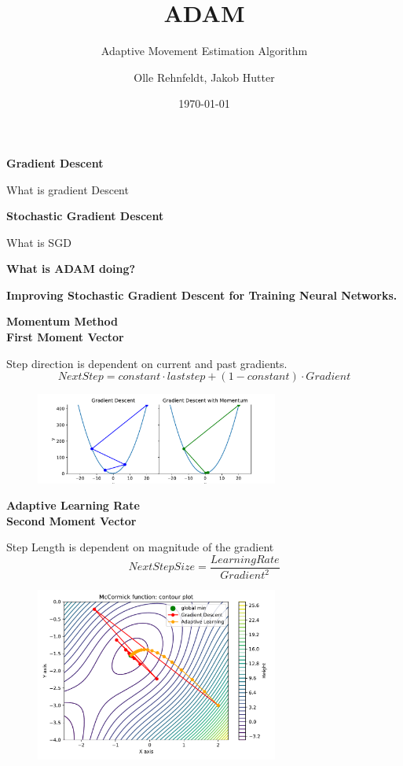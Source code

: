 \documentclass{beamer}
\author{Olle Rehnfeldt, Jakob Hutter}
\title{ADAM}
\subtitle{Adaptive Movement Estimation Algorithm}
\institute{Data Science and Society}
\date{\today}
\newcommand\myheading[1]{%
  \par\bigskip
  {\Large\bfseries#1}\par\smallskip}
\begin{document}
\begin{frame}
    \titlepage
\end{frame}


\begin{frame}
    \myheading{Gradient Descent}
    What is gradient Descent
\end{frame}


\begin{frame}
    \myheading{Stochastic Gradient Descent}
    What is SGD
\end{frame}

\begin{frame}
    \myheading{What is ADAM doing?}
\end{frame}
\begin{frame}
    \myheading{Improving Stochastic Gradient Descent for Training Neural Networks.}
\end{frame}


\begin{frame}
    \myheading{Momentum Method\\First Moment Vector}
    Step direction is dependent on current and past gradients.
    $$Next Step = constant \cdot last step + (1-constant) \cdot Gradient$$
    
    \begin{figure}[h]
        \includegraphics[width=8cm]{report/figures/GD_momentum.pdf}
    \end{figure}
\end{frame}


\begin{frame}
    \myheading{Adaptive Learning Rate\\Second Moment Vector}
    Step Length is dependent on magnitude of the gradient
    $$NextStepSize = \frac{LearningRate}{Gradient^2} $$
    
    \begin{figure}[h]
        \includegraphics[width=8cm]{report/figures/GD_rmsprop.pdf}
    \end{figure}
\end{frame}
\end{document}
